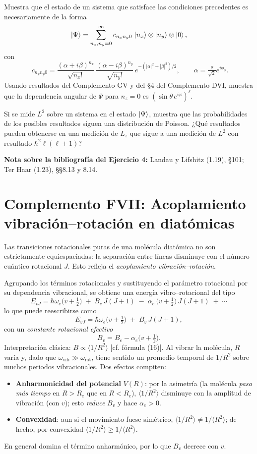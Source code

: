 \documentclass[a4paper,11pt]{article}
\begin{document}
Muestra que el estado de un sistema que satisface las condiciones precedentes es necesariamente de la forma
\[
\ket{\Psi}=\sum_{n_x,n_y=0}^{\infty}c_{n_xn_y0}\,\ket{n_x}\otimes\ket{n_y}\otimes\ket{0},
\]
con
\[
\;c_{n_xn_y0}=\frac{(\alpha+ i\beta)^{n_x}}{\sqrt{n_x!}}\,\frac{(\alpha- i\beta)^{n_y}}{\sqrt{n_y!}}\,e^{-(|\alpha|^2+|\beta|^2)/2},\qquad \alpha=\tfrac{\rho}{\sqrt{2}}e^{i\phi_0}.
\]
Usando resultados del Complemento GV y del §4 del Complemento DVI, muestra que la dependencia angular de $\Psi$ para $n_z=0$ es $(\sin\theta\,e^{i\varphi})^{\ell}$.

Si se mide $L^2$ sobre un sistema en el estado $\ket{\Psi}$, muestra que las probabilidades de los posibles resultados siguen una distribución de Poisson. ¿Qué resultados pueden obtenerse en una medición de $L_z$ que sigue a una medición de $L^2$ con resultado $\hbar^2\ell(\ell+1)$?

\vspace{6pt}
\noindent\textbf{Nota sobre la bibliografía del Ejercicio 4:} Landau y Lifshitz (1.19), §101; Ter Haar (1.23), §§8.13 y 8.14.

\section*{Complemento FVII: Acoplamiento vibración–rotación en diatómicas}
Las transiciones rotacionales puras de una molécula diatómica no son estrictamente equiespaciadas: la separación entre líneas disminuye con el número cuántico rotacional $J$. Esto refleja el \emph{acoplamiento vibración–rotación}.

Agrupando los términos rotacionales y sustituyendo el parámetro rotacional por su dependencia vibracional, se obtiene una energía vibro–rotacional del tipo
\[
E_{vJ}=\hbar\omega_e\Big(v+\tfrac12\Big)\;+\;B_e\,J(J+1)\;-\;\alpha_e\,\Big(v+\tfrac12\Big)\,J(J+1)\; +\;\cdots\tag{53}
\]
lo que puede reescribirse como
\[
E_{vJ}=\hbar\omega_e\Big(v+\tfrac12\Big)\; +\; B_v\,J(J+1),\tag{54}
\]
con un \emph{constante rotacional efectivo}
\[
B_v= B_e-\alpha_e\Big(v+\tfrac12\Big).\tag{55}
\]
Interpretación clásica: $B\propto \langle 1/R^2\rangle$ [cf. fórmula (16)]. Al vibrar la molécula, $R$ varía y, dado que $\omega_{\text{vib}}\gg \omega_{\text{rot}}$, tiene sentido un promedio temporal de $1/R^2$ sobre muchos periodos vibracionales. Dos efectos compiten:
\begin{itemize}
	\item \textbf{Anharmonicidad del potencial} $V(R)$: por la asimetría (la molécula \emph{pasa más tiempo} en $R>R_e$ que en $R<R_e$), $\langle 1/R^2\rangle$ disminuye con la amplitud de vibración (con $v$); esto \emph{reduce} $B_v$ y hace $\alpha_e>0$.
	\item \textbf{Convexidad}: aun si el movimiento fuese simétrico, $\langle 1/R^2\rangle\neq 1/\langle R^2\rangle$; de hecho, por convexidad $\langle 1/R^2\rangle\ge 1/\langle R^2\rangle$.
\end{itemize}
En general domina el término anharmónico, por lo que $B_v$ decrece con $v$.
\end{document}
